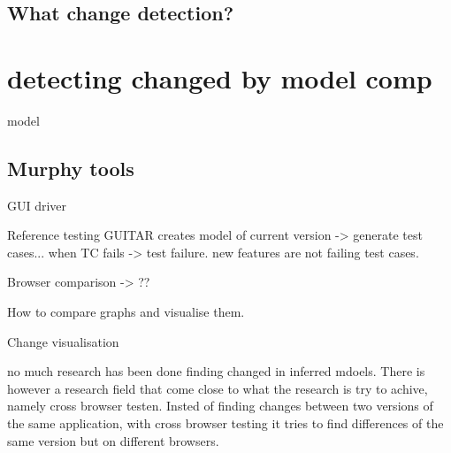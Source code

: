 \subsection{What change detection?}


\section{detecting changed by model comp} 

model 

\subsection{Murphy tools}

GUI driver 

Reference testing GUITAR creates model of current version -> generate test cases... when TC fails -> test failure. 
new features are not failing test cases. 

Browser comparison -> ??

How to compare graphs and visualise them. 

Change visualisation

no much research has been done finding changed in inferred mdoels. There is however a research field that come close to what the research is try to achive, namely cross browser testen. Insted of finding changes between two versions of the same application, with cross browser testing it tries to find differences of the same version but on different browsers.




